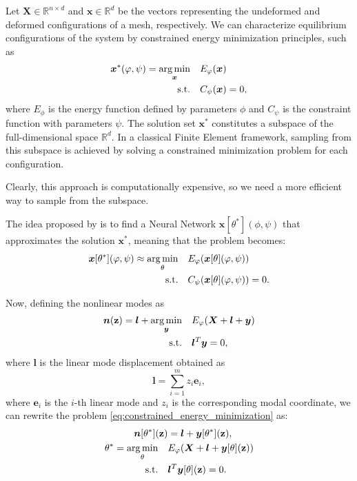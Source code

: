 Let \( \bm{X} \in \mathbb{R}^{n \times d} \) and \( \bm{x} \in \mathbb{R}^{d} \) be the vectors representing the undeformed and deformed configurations of a mesh, respectively. We can characterize equilibrium configurations of the system by constrained energy minimization principles, such as 
\begin{align}
    \label{eq:constrained_energy_minimization}
    \bm{x}^*(\varphi, \psi) = \underset{\bm{x}}{\operatorname*{arg\,min}} \quad & E_\varphi(\bm{x}) \\
    \text{s.t.} \quad & C_\psi(\bm{x}) = 0, \nonumber
\end{align}
where \( E_\phi \) is the energy function defined by parameters \(\phi\) and \( C_\psi \) is the constraint function with parameters \(\psi\). The solution set \( \bm{x}^*\) constitutes a subspace of the full-dimensional space \( \mathbb{R}^d \). In a classical Finite Element framework, sampling from this subspace is achieved by solving a constrained minimization problem for each configuration. 

Clearly, this approach is computationally expensive, so we need a more efficient way to sample from the subspace.

The idea proposed by \cite{Wang_Du_Coros_Thomaszewski_2024} is to find a Neural Network \( \bm{x}[\theta^*](\phi, \psi) \) that approximates the solution \( \bm{x}^* \), meaning that the problem becomes:
\begin{align*}
    \bm{x}[\theta^*](\varphi, \psi) \approx \underset{\theta}{\operatorname*{arg\,min}} \quad & E_\varphi(\bm{x}[\theta](\varphi, \psi)) \\
    \text{s.t.} \quad & C_\psi(\bm{x}[\theta](\varphi, \psi)) = 0.
\end{align*}

Now, defining the nonlinear modes as 
\begin{align}
    \bm{n}(\mathbf{z}) = \bm{l} + \operatorname*{arg\,min}_{\bm{y}} \quad & E_\varphi(\bm{X} + \bm{l} + \bm{y}) \\ 
    \text{s.t.} \quad & \bm{l}^T \bm{y} = 0,
\end{align}
where \( \bm{l} \) is the linear mode displacement obtained as
\begin{equation}
    \bm{l} = \sum_{i=1}^m z_i \bm{e}_i,
\end{equation}
where \( \bm{e}_i \) is the $i$-th linear mode and \( z_i \) is the corresponding modal coordinate, we can rewrite the problem \ref{eq:constrained_energy_minimization} as:
\begin{align*}
    \bm{n}[\theta^*](\mathbf{z}) &= \bm{l} + \bm{y}[\theta^*](\mathbf{z}), \\
    \theta^* = \underset{\theta}{\operatorname*{arg\,min}} \quad & E_\varphi(\bm{X} + \bm{l} + \bm{y}[\theta](\mathbf{z})) \\
    \text{s.t.} \quad & \bm{l}^T \bm{y}[\theta](\mathbf{z}) = 0.
\end{align*}

